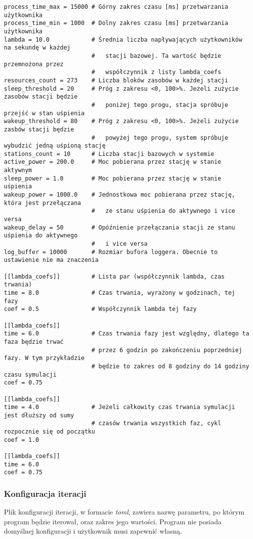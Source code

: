 {
\selectfont 
\begin{verbatim}
process_time_max = 15000 # Górny zakres czasu [ms] przetwarzania użytkownika
process_time_min = 1000  # Dolny zakres czasu [ms] przetwarzania użytkownika
lambda = 10.0            # Średnia liczba napływających użytkowników na sekundę w każdej
                         #   stacji bazowej. Ta wartość będzie przemnożona przez
                         #   współczynnik z listy lambda_coefs
resources_count = 273    # Liczba bloków zasobów w każdej stacji
sleep_threshold = 20     # Próg z zakresu <0, 100>%. Jeżeli zużycie zasobów stacji będzie
                         #   poniżej tego progu, stacja spróbuje przejść w stan uśpienia
wakeup_threshold = 80    # Próg z zakresu <0, 100>%. Jeżeli zużycie zasbów stacji będzie
                         #   powyżej tego progu, system spróbuje wybudzić jedną uśpioną stację
stations_count = 10      # Liczba stacji bazowych w systemie
active_power = 200.0     # Moc pobierana przez stację w stanie aktywnym
sleep_power = 1.0        # Moc pobierana przez stację w stanie uśpienia
wakeup_power = 1000.0    # Jednostkowa moc pobierana przez stację, która jest przełączana
                         #   ze stanu uśpienia do aktywnego i vice versa
wakeup_delay = 50        # Opóźnienie przełączania stacji ze stanu uśpienia do aktywnego
                         #   i vice versa
log_buffer = 10000       # Rozmiar bufora loggera. Obecnie to ustawienie nie ma znaczenia

[[lambda_coefs]]         # Lista par (współczynnik lambda, czas trwania)
time = 8.0               # Czas trwania, wyrażony w godzinach, tej fazy
coef = 0.5               # Współczynnik lambda tej fazy

[[lambda_coefs]]
time = 6.0               # Czas trwania fazy jest względny, dlatego ta faza będzie trwać
                         # przez 6 godzin po zakończeniu poprzedniej fazy. W tym przykładzie
                         # będzie to zakres od 8 godziny do 14 godziny czasu symulacji
coef = 0.75

[[lambda_coefs]]
time = 4.0               # Jeżeli całkowity czas trwania symulacji jest dłuższy od sumy
                         # czasów trwania wszystkich faz, cykl rozpocznie się od początku
coef = 1.0

[[lambda_coefs]]
time = 6.0
coef = 0.75
\end{verbatim}
}

\subsubsection{Konfiguracja iteracji}
Plik konfiguracji iteracji, w formacie \emph{toml}, zawiera nazwę parametru, po którym program będzie iterował, oraz zakres jego wartości. Program nie posiada domyślnej konfiguracji i użytkownik musi zapewnić własną.

